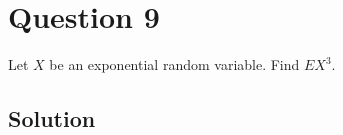 \section*{Question 9}

Let \( X \) be an exponential random variable.
Find \( E X^{3} \).

\subsection*{Solution}
